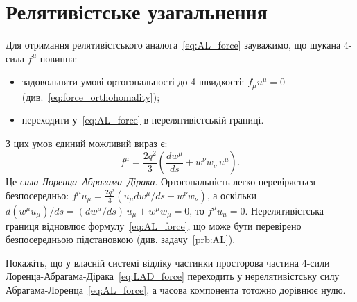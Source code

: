 \section{Релятивістське узагальнення}

Для отримання релятивістського аналога~\eqref{eq:AL_force} зауважимо, що шукана 4-сила $f^{\mu}$ повинна:
\begin{itemize}
	\item задовольняти умові ортогональності до 4-швидкості: $f_{\mu}u^{\mu} = 0$ (див.~\eqref{eq:force_orthohomality});
	\item переходити у~\eqref{eq:AL_force} в нерелятивістській границі.
\end{itemize}
З цих умов єдиний можливий вираз є:
\begin{equation}\label{eq:LAD_force}
	f^{\mu} = \frac{2q^2}{3}
	\left( \frac{dw^{\mu}}{ds} + w^{\nu}w_{\nu}\, u^{\mu} \right).
\end{equation}
Це \emph{сила Лоренца–Абрагама–Дірака}. Ортогональність легко перевіряється безпосередньо: $f^{\mu}u_{\mu} = \frac{2q^2}{3}(u_{\mu}dw^{\mu}/ds + w^{\nu}w_{\nu})$, а оскільки $d(w^{\mu}u_{\mu})/ds = (dw^{\mu}/ds)\,u_{\mu} + w^{\mu}w_{\mu} = 0$, то $f^{\mu}u_{\mu} = 0$. Нерелятивістська границя відновлює формулу~\eqref{eq:AL_force}, що може бути перевірено безпосередньою підстановкою (див. задачу~\ref{prb:AL}).

\begin{problem}\label{prb:AL}
Покажіть, що у власній системі відліку частинки просторова частина 4-сили Лоренца-Абрагама-Дірака~\eqref{eq:LAD_force} переходить у нерелятивістську силу Абрагама-Лоренца~\eqref{eq:AL_force}, а часова компонента тотожно дорівнює нулю.
\end{problem}

